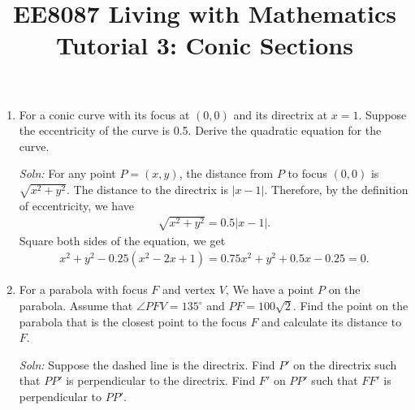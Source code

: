 \documentclass{article}
\title{EE8087 Living with Mathematics\\Tutorial 3: Conic Sections}
\date{}
\begin{document}
 \maketitle
\begin{enumerate}
\item For a conic curve with its focus at $(0,0)$ and its directrix at $x = 1$. Suppose the eccentricity of the curve is 0.5. Derive the quadratic equation for the curve.

  \emph{Soln:} For any point $P = (x,y)$, the distance from $P$ to focus $(0,0)$ is $\sqrt{x^2+y^2}$. The distance to the directrix is $|x-1|$. Therefore, by the definition of eccentricity, we have
  \begin{align*}
    \sqrt{x^2+ y^2} = 0.5|x-1|.
  \end{align*}
  Square both sides of the equation, we get
  \begin{align*}
    x^2+ y^2 - 0.25(x^2 - 2x + 1) = 0.75x^2 + y^2 +0.5x -0.25 = 0.
  \end{align*}


\item For a parabola with focus $F$ and vertex $V$, We have a point $P$ on the parabola. Assume that $\angle PFV = 135^\circ$ and $PF = 100\sqrt{2}$. Find the point on the parabola that is the closest point to the focus $F$ and calculate its distance to $F$.
  
\begin{figure}[h]
  \centering
{}
\end{figure}
\emph{Soln:} Suppose the dashed line is the directrix. Find $P'$ on the directrix such that $PP'$ is perpendicular to the directrix. Find $F'$ on $PP'$ such that $FF'$ is perpendicular to $PP'$.


\end{enumerate}
\end{document}
